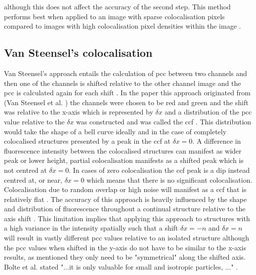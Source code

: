 \cite{Bolte-2006} although this does not affect the accuracy of the second step. This method performs best when applied to an image with sparse colocalisation pixels compared to images with high colocalisation pixel densities within the image \cite{costes}.
\subsection{Van Steensel's colocalisation}
Van Steensel's approach entails the calculation of \gls{pcc} between two channels and then one of the channels is shifted relative to the other channel image and the \gls{pcc} is calculated again for each shift \cite{vanSteensel}. In the paper this approach originated from (Van Steensel et al. \cite{vanSteensel}) the channels were chosen to be red and green and the shift was relative to the x-axis which is represented by $\delta x$ and a distribution of the \gls{pcc} value relative to the $\delta x$ was constructed and was called the \gls{ccf} \cite[p.223-225]{Bolte-2006}. This distribution would take the shape of a bell curve ideally and in the case of completely colocalised structures presented by a peak in the \gls{ccf} at $\delta x=0$. A difference in fluorescence intensity between the colocalised structures can manifest as wider peak or lower height, partial colocalisation manifests as a shifted peak which is not centred at $\delta x=0$. In cases of zero colocalisation the \gls{ccf} peak is a dip instead centred at, or near, $\delta x=0$ which means that there is no significant colocalisation. Colocalisation due to random overlap or high noise will manifest as a \gls{ccf} that is relatively flat \cite{Bolte-2006, vanSteensel}. The accuracy of this approach is heavily influenced by the shape and distribution of fluorescence throughout a continual structure relative to the axis shift \cite{Bolte-2006}. This limitation implies that applying this approach to structures with a high variance in the intensity spatially such that a shift $\delta x=-n$ and $\delta x=n$ will result in vastly different \gls{pcc} values relative to an isolated structure although the \gls{pcc} values when shifted in the y-axis do not have to be similar to the x-axis results, as mentioned they only need to be "symmetrical" along the shifted axis. Bolte et al. stated "...it is only valuable for small and isotropic particles, ..." \cite[p.225]{Bolte-2006}.
